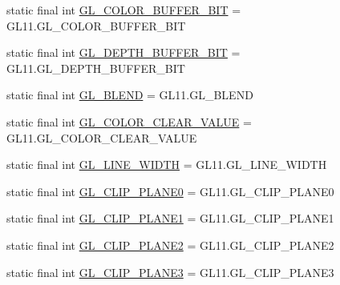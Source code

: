 \begin{DoxyCompactItemize}
static final int \mbox{\hyperlink{interfaceorg_1_1newdawn_1_1slick_1_1opengl_1_1renderer_1_1_s_g_l_ab16fab92705be54e5b9d1284e24ef2da}{G\+L\+\_\+\+C\+O\+L\+O\+R\+\_\+\+B\+U\+F\+F\+E\+R\+\_\+\+B\+IT}} = G\+L11.\+G\+L\+\_\+\+C\+O\+L\+O\+R\+\_\+\+B\+U\+F\+F\+E\+R\+\_\+\+B\+IT
\item 
static final int \mbox{\hyperlink{interfaceorg_1_1newdawn_1_1slick_1_1opengl_1_1renderer_1_1_s_g_l_ae703cfdbede3fb389851e894b774313b}{G\+L\+\_\+\+D\+E\+P\+T\+H\+\_\+\+B\+U\+F\+F\+E\+R\+\_\+\+B\+IT}} = G\+L11.\+G\+L\+\_\+\+D\+E\+P\+T\+H\+\_\+\+B\+U\+F\+F\+E\+R\+\_\+\+B\+IT
\item 
static final int \mbox{\hyperlink{interfaceorg_1_1newdawn_1_1slick_1_1opengl_1_1renderer_1_1_s_g_l_a2f1126cbb48be8d721f68f65bbed18f8}{G\+L\+\_\+\+B\+L\+E\+ND}} = G\+L11.\+G\+L\+\_\+\+B\+L\+E\+ND
\item 
static final int \mbox{\hyperlink{interfaceorg_1_1newdawn_1_1slick_1_1opengl_1_1renderer_1_1_s_g_l_a39ed964d8594c5f921ae2d27996f2171}{G\+L\+\_\+\+C\+O\+L\+O\+R\+\_\+\+C\+L\+E\+A\+R\+\_\+\+V\+A\+L\+UE}} = G\+L11.\+G\+L\+\_\+\+C\+O\+L\+O\+R\+\_\+\+C\+L\+E\+A\+R\+\_\+\+V\+A\+L\+UE
\item 
static final int \mbox{\hyperlink{interfaceorg_1_1newdawn_1_1slick_1_1opengl_1_1renderer_1_1_s_g_l_ab44ba599586c940b234eed4155aa4483}{G\+L\+\_\+\+L\+I\+N\+E\+\_\+\+W\+I\+D\+TH}} = G\+L11.\+G\+L\+\_\+\+L\+I\+N\+E\+\_\+\+W\+I\+D\+TH
\item 
static final int \mbox{\hyperlink{interfaceorg_1_1newdawn_1_1slick_1_1opengl_1_1renderer_1_1_s_g_l_a71b33b0b55131d3c1219b64ee1bd92cd}{G\+L\+\_\+\+C\+L\+I\+P\+\_\+\+P\+L\+A\+N\+E0}} = G\+L11.\+G\+L\+\_\+\+C\+L\+I\+P\+\_\+\+P\+L\+A\+N\+E0
\item 
static final int \mbox{\hyperlink{interfaceorg_1_1newdawn_1_1slick_1_1opengl_1_1renderer_1_1_s_g_l_aa29399287fa4030c915cabd9815667c6}{G\+L\+\_\+\+C\+L\+I\+P\+\_\+\+P\+L\+A\+N\+E1}} = G\+L11.\+G\+L\+\_\+\+C\+L\+I\+P\+\_\+\+P\+L\+A\+N\+E1
\item 
static final int \mbox{\hyperlink{interfaceorg_1_1newdawn_1_1slick_1_1opengl_1_1renderer_1_1_s_g_l_ace7247e062a8dd71316b366ab96ac36f}{G\+L\+\_\+\+C\+L\+I\+P\+\_\+\+P\+L\+A\+N\+E2}} = G\+L11.\+G\+L\+\_\+\+C\+L\+I\+P\+\_\+\+P\+L\+A\+N\+E2
\item 
static final int \mbox{\hyperlink{interfaceorg_1_1newdawn_1_1slick_1_1opengl_1_1renderer_1_1_s_g_l_aced0cad0ace416348b90752c159681ef}{G\+L\+\_\+\+C\+L\+I\+P\+\_\+\+P\+L\+A\+N\+E3}} = G\+L11.\+G\+L\+\_\+\+C\+L\+I\+P\+\_\+\+P\+L\+A\+N\+E3
\item 

\end{DoxyCompactItemize}

